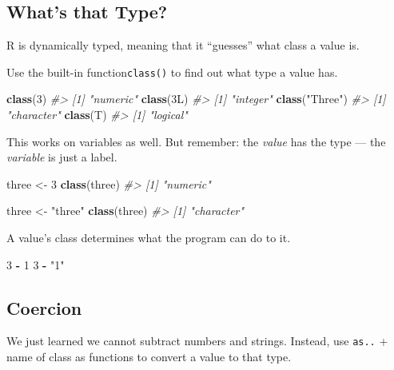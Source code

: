 \documentclass[]{book}
\newenvironment{Shaded}{\begin{snugshade}}{\end{snugshade}}
\newcommand{\KeywordTok}[1]{\textcolor[rgb]{0.13,0.29,0.53}{\textbf{#1}}}
\newcommand{\DecValTok}[1]{\textcolor[rgb]{0.00,0.00,0.81}{#1}}
\newcommand{\StringTok}[1]{\textcolor[rgb]{0.31,0.60,0.02}{#1}}
\newcommand{\CommentTok}[1]{\textcolor[rgb]{0.56,0.35,0.01}{\textit{#1}}}
\newcommand{\OperatorTok}[1]{\textcolor[rgb]{0.81,0.36,0.00}{\textbf{#1}}}
\newcommand{\NormalTok}[1]{#1}
\begin{document}
\subsection{What's that Type?}\label{whats-that-type}

R is dynamically typed, meaning that it ``guesses'' what class a value
is.

Use the built-in function\texttt{class()} to find out what type a value
has.

\begin{Shaded}
\begin{Highlighting}[]
\KeywordTok{class}\NormalTok{(}\DecValTok{3}\NormalTok{)}
\CommentTok{#> [1] "numeric"}
\KeywordTok{class}\NormalTok{(3L)}
\CommentTok{#> [1] "integer"}
\KeywordTok{class}\NormalTok{(}\StringTok{"Three"}\NormalTok{)}
\CommentTok{#> [1] "character"}
\KeywordTok{class}\NormalTok{(T)}
\CommentTok{#> [1] "logical"}
\end{Highlighting}
\end{Shaded}

This works on variables as well. But remember: the \emph{value} has the
type --- the \emph{variable} is just a label.

\begin{Shaded}
\begin{Highlighting}[]
\NormalTok{three <-}\StringTok{ }\DecValTok{3}
\KeywordTok{class}\NormalTok{(three)}
\CommentTok{#> [1] "numeric"}

\NormalTok{three <-}\StringTok{ "three"}
\KeywordTok{class}\NormalTok{(three)}
\CommentTok{#> [1] "character"}
\end{Highlighting}
\end{Shaded}

A value's class determines what the program can do to it.

\begin{Shaded}
\begin{Highlighting}[]
\DecValTok{3} \OperatorTok{-}\StringTok{ }\DecValTok{1}
\DecValTok{3} \OperatorTok{-}\StringTok{ "1"}
\end{Highlighting}
\end{Shaded}

\subsection{Coercion}\label{coercion}

We just learned we cannot subtract numbers and strings. Instead, use
\texttt{as..} + name of class as functions to convert a value to that
type.
\end{document}
